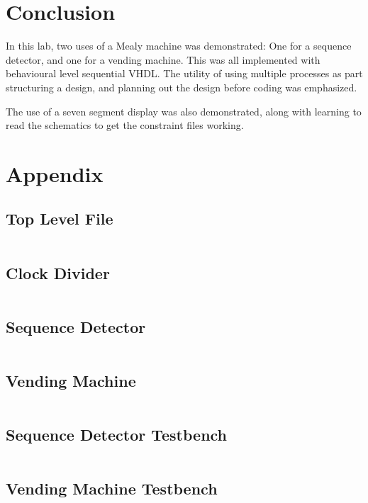 \documentclass[12pt]{article}
\begin{document}
\section{Conclusion}

In this lab, two uses of a Mealy machine was demonstrated: One for a sequence detector, and one for a vending machine. This was all implemented with behavioural level sequential VHDL. The utility of using multiple processes as part structuring a design, and planning out the design before coding was emphasized.

The use of a seven segment display was also demonstrated, along with learning to read the schematics to get the constraint files working.

\pagebreak
\section{Appendix}

\subsection{Top Level File}
\inputminted{vhdl}{../src/Lab2_top.vhd}

\pagebreak
\subsection{Clock Divider}
\inputminted{vhdl}{../src/ClockDivider.vhd}

\pagebreak
\subsection{Sequence Detector}
\inputminted{vhdl}{../src/SequenceDetector.vhd}

\pagebreak
\subsection{Vending Machine}
\inputminted{vhdl}{../src/VendingMachine.vhd}

\pagebreak
\subsection{Sequence Detector Testbench}
\inputminted{vhdl}{../test/SequenceDetector_tb.vhd}

\pagebreak
\subsection{Vending Machine Testbench}
\inputminted{vhdl}{../test/VendingMachine_tb.vhd}
\end{document}
